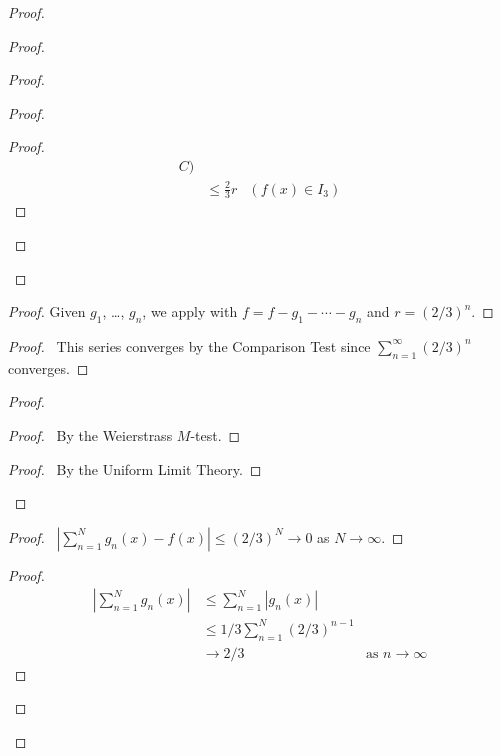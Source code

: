 \documentclass{report}
\theoremstyle{definition}
\begin{document}
\begin{proof}
\begin{proof}
\begin{proof}
\begin{proof}
\begin{proof}
\begin{align*}
C) \\
            & \leq \frac{2}{3} r & (f(x) \in I_3)
          \end{align*}
        \end{proof}
      \end{proof}
    \end{proof}
    \begin{proof}
      \pf Given $g_1$, \ldots, $g_n$, we apply  with $f = f - g_1
- \cdots - g_n$ and $r = (2/3)^n$.
    \end{proof}
    \begin{proof}
      \pf\ This series converges by the Comparison Test since
$\sum_{n=1}^\infty (2/3)^n$ converges.
    \end{proof}
    \begin{proof}
      \begin{proof}
        \pf\ By the Weierstrass $M$-test.
      \end{proof}
      \qedstep
      \begin{proof}
        \pf\ By the Uniform Limit Theory.
      \end{proof}
    \end{proof}
    \begin{proof}
      \pf\ $|\sum_{n=1}^N g_n(x) - f(x)| \leq (2/3)^N \rightarrow 0$ as $N
\rightarrow \infty$.
    \end{proof}
    \begin{proof}
      \pf
      \begin{align*}
        |\sum_{n=1}^N g_n(x)| & \leq \sum_{n=1}^N |g_n(x) | \\
        & \leq 1/3 \sum_{n=1}^N (2/3)^{n-1} \\
        & \rightarrow 2/3 & \text{as } n \rightarrow \infty
      \end{align*}

\end{proof}
\end{proof}
\end{proof}
\end{document}
